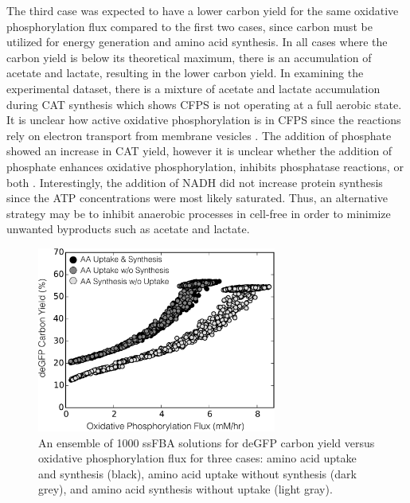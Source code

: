 \documentclass[journal=asbcd6,manuscript=article]{achemso}
\begin{document}
The third case was expected to have a lower carbon yield for the same oxidative phosphorylation flux compared to the first two cases, since carbon must be utilized for energy generation and amino acid synthesis. 
In all cases where the carbon yield is below its theoretical maximum, there is an accumulation of acetate and lactate, resulting in the lower carbon yield. 
In examining the experimental dataset, there is a mixture of acetate and lactate accumulation during CAT synthesis which shows CFPS is not operating at a full aerobic state.
It is unclear how active oxidative phosphorylation is in CFPS since the reactions rely on electron transport from membrane vesicles . 
The addition of phosphate showed an increase in CAT yield, however it is unclear whether the addition of phosphate enhances oxidative phosphorylation, inhibits phosphatase reactions, or both \cite{Jewett:2008aa}. 
Interestingly, the addition of NADH did not increase protein synthesis since the ATP concentrations were most likely saturated. 
Thus, an alternative strategy may be to inhibit anaerobic processes in cell-free in order to minimize unwanted byproducts such as acetate and lactate.
\begin{figure}[t!]
\includegraphics[width=0.7\textwidth]{./Figures/Yield_Ox.pdf}
\caption{An ensemble of 1000 ssFBA solutions for deGFP carbon yield versus oxidative phosphorylation flux for three cases: amino acid uptake and synthesis (black), amino acid uptake without synthesis (dark grey), and amino acid synthesis without uptake (light gray).}
\label{fig:oxphos_yield}
\end{figure}
\end{document}
